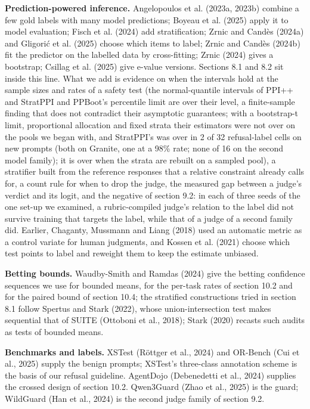 \documentclass[11pt]{article}
\begin{document}
\textbf{Prediction-powered inference.} Angelopoulos et al. (2023a, 2023b) combine a few gold labels with many model predictions; Boyeau et al. (2025) apply it to model evaluation; Fisch et al. (2024) add stratification; Zrnic and Candès (2024a) and Gligorić et al. (2025) choose which items to label; Zrnic and Candès (2024b) fit the predictor on the labelled data by cross-fitting; Zrnic (2024) gives a bootstrap; Csillag et al. (2025) give e-value versions. Sections 8.1 and 8.2 sit inside this line. What we add is evidence on when the intervals hold at the sample sizes and rates of a safety test (the normal-quantile intervals of PPI++ and StratPPI and PPBoot's percentile limit are over their level, a finite-sample finding that does not contradict their asymptotic guarantees; with a bootstrap-t limit, proportional allocation and fixed strata their estimators were not over on the pools we began with, and StratPPI's was over in 2 of 32 refusal-label cells on new prompts (both on Granite, one at a 98\% rate; none of 16 on the second model family); it is over when the strata are rebuilt on a sampled pool), a stratifier built from the reference responses that a relative constraint already calls for, a count rule for when to drop the judge, the measured gap between a judge's verdict and its logit, and the negative of section 9.2: in each of three seeds of the one set-up we examined, a rubric-compiled judge's relation to the label did not survive training that targets the label, while that of a judge of a second family did. Earlier, Chaganty, Mussmann and Liang (2018) used an automatic metric as a control variate for human judgments, and Kossen et al. (2021) choose which test points to label and reweight them to keep the estimate unbiased.


\textbf{Betting bounds.} Waudby-Smith and Ramdas (2024) give the betting confidence sequences we use for bounded means, for the per-task rates of section 10.2 and for the paired bound of section 10.4; the stratified constructions tried in section 8.1 follow Spertus and Stark (2022), whose union-intersection test makes sequential that of SUITE (Ottoboni et al., 2018); Stark (2020) recasts such audits as tests of bounded means.


\textbf{Benchmarks and labels.} XSTest (Röttger et al., 2024) and OR-Bench (Cui et al., 2025) supply the benign prompts; XSTest's three-class annotation scheme is the basis of our refusal guideline. AgentDojo (Debenedetti et al., 2024) supplies the crossed design of section 10.2. Qwen3Guard (Zhao et al., 2025) is the guard; WildGuard (Han et al., 2024) is the second judge family of section 9.2.
\end{document}
